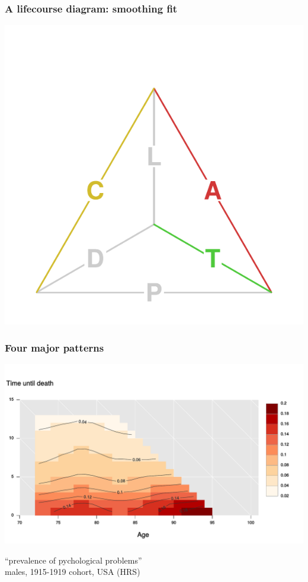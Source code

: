 \documentclass[20pt]{beamer}
\begin{document}
\begin{frame}
\frametitle{A lifecourse diagram: smoothing fit}
\centering
\includegraphics[scale=1.5]{Figures/TetraHedronEdgesOnlyFit.pdf}\\
\end{frame}

\begin{frame}
\frametitle{Four major patterns}
\begin{centering}
\includegraphics[scale=.95]{Figures/Figure2a.pdf}\\
\end{centering}
``prevalence of pychological problems''\\
males, 1915-1919 cohort, USA (HRS)
\end{frame}
\end{document}
